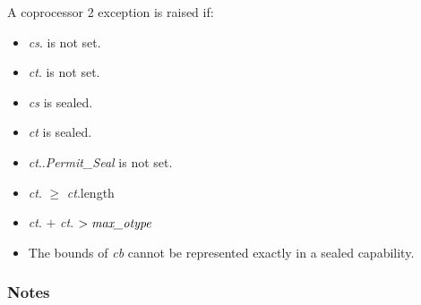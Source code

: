 A coprocessor 2 exception is raised if:

\begin{itemize}
\item
\emph{cs}.\ctag{} is not set.
\item
\emph{ct}.\ctag{} is not set.
\item
\emph{cs} is sealed.
\item
\emph{ct} is sealed.
\item
\emph{ct}.\cperms.\emph{Permit\_Seal} is not set.
\item
\emph{ct}.\coffset{} $\ge$ \emph{ct}.length{}
\item
\emph{ct}.\cbase{} $+$ \emph{ct}.\coffset{} $> \emph{max\_otype}$
\item
The bounds of \emph{cb} cannot be represented exactly in a sealed capability.
\end{itemize}

\subsubsection*{Notes}
